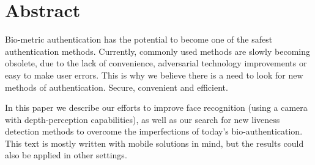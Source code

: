 
\section*{Abstract}
Bio-metric authentication has the potential to become
one of the safest authentication methods.
Currently, commonly used methods are slowly becoming obsolete,
due to the lack of convenience, adversarial technology
improvements or easy to make user errors.
This is why we believe there is a need to look for
new methods of authentication. Secure, convenient and efficient.\par
\bigskip


In this paper we describe our efforts to improve face recognition
(using a camera with depth-perception capabilities), as well as
our search for new liveness detection methods to overcome
the imperfections of today's bio-authentication.\\
This text is mostly written with mobile solutions in mind,
but the results could also be applied in other settings.
